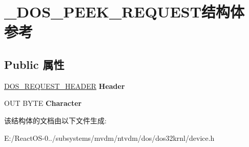 \hypertarget{struct___d_o_s___p_e_e_k___r_e_q_u_e_s_t}{}\section{\+\_\+\+D\+O\+S\+\_\+\+P\+E\+E\+K\+\_\+\+R\+E\+Q\+U\+E\+S\+T结构体 参考}
\label{struct___d_o_s___p_e_e_k___r_e_q_u_e_s_t}
\subsection*{Public 属性}
\begin{DoxyCompactItemize}
\item 
\mbox{\label{struct___d_o_s___p_e_e_k___r_e_q_u_e_s_t_a5606d2046f6e0732249a7209a8791f54}} 
\hyperlink{struct___d_o_s___r_e_q_u_e_s_t___h_e_a_d_e_r}{D\+O\+S\+\_\+\+R\+E\+Q\+U\+E\+S\+T\+\_\+\+H\+E\+A\+D\+ER} {\bfseries Header}
\item 
\mbox{\label{struct___d_o_s___p_e_e_k___r_e_q_u_e_s_t_ac8a739bb12ceefaf34c70f209fbac0c0}} 
O\+UT B\+Y\+TE {\bfseries Character}
\end{DoxyCompactItemize}


该结构体的文档由以下文件生成\+:\begin{DoxyCompactItemize}
\item 
E\+:/\+React\+O\+S-\/0../subsystems/mvdm/ntvdm/dos/dos32krnl/device.\+h\end{DoxyCompactItemize}

